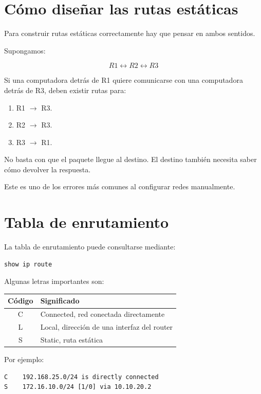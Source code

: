 \documentclass[12pt]{article}
\begin{document}
\section{Cómo diseñar las rutas estáticas}

Para construir rutas estáticas correctamente hay que pensar en ambos sentidos.

Supongamos:

\[
R1 \longleftrightarrow R2 \longleftrightarrow R3
\]

Si una computadora detrás de R1 quiere comunicarse con una computadora
detrás de R3, deben existir rutas para:

\begin{enumerate}
    \item R1 $\rightarrow$ R3.
    \item R2 $\rightarrow$ R3.
    \item R3 $\rightarrow$ R1.
\end{enumerate}

No basta con que el paquete llegue al destino. El destino también necesita
saber cómo devolver la respuesta.

Este es uno de los errores más comunes al configurar redes manualmente.


\section{Tabla de enrutamiento}

La tabla de enrutamiento puede consultarse mediante:

\begin{lstlisting}
show ip route
\end{lstlisting}

Algunas letras importantes son:

\begin{center}
\begin{tabular}{|c|l|}
\hline
\textbf{Código} & \textbf{Significado} \\
\hline
C & Connected, red conectada directamente \\
L & Local, dirección de una interfaz del router \\
S & Static, ruta estática \\
\hline
\end{tabular}
\end{center}

Por ejemplo:

\begin{lstlisting}
C    192.168.25.0/24 is directly connected
S    172.16.10.0/24 [1/0] via 10.10.20.2
\end{lstlisting}
\end{document}
